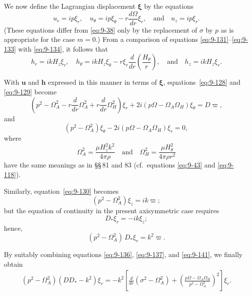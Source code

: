 We now define the Lagrangian displacement $\boldsymbol{\xi}$ by the equations
\begin{equation}
u_r = ip\xi_r, \quad u_\theta = ip\xi_\theta - r\frac{d\Omega}{dr}\xi_r, \quad \text{and} \quad u_z = ip\xi_r. \label{eq:9-134}
\end{equation}
(These equations differ from \eqref{eq:9-38} only by the replacement of $\sigma$ by $p$ as is appropriate for the case $m = 0$.) From a comparison of equations \eqref{eq:9-131}--\eqref{eq:9-133} with \eqref{eq:9-134}, it follows that
\begin{equation}
h_r = ikH_z\xi_r, \quad h_\theta = ikH_z\xi_\theta - r\xi_r\frac{d}{dr}\!\left(\frac{H_\theta}{r}\right), \quad \text{and} \quad h_z = ikH_z\xi_r. \label{eq:9-135}
\end{equation}

With $\mathbf{u}$ and $\mathbf{h}$ expressed in this manner in terms of $\boldsymbol{\xi}$, equations~\eqref{eq:9-128} and \eqref{eq:9-129} become
\begin{equation}
\left(p^2 - \Omega_A^2 - r\frac{d}{dr}\Omega_A^2 + r\frac{d}{dr}\Omega_H^2\right)\xi_r + 2i(p\Omega - \Omega_A\Omega_H)\xi_\theta = D\varpi, \label{eq:9-136}
\end{equation}
and
\begin{equation}
(p^2 - \Omega_A^2)\xi_\theta - 2i(p\Omega - \Omega_A\Omega_H)\xi_r = 0, \label{eq:9-137}
\end{equation}
where
\begin{equation}
\Omega_A^2 = \frac{\mu H_z^2 k^2}{4\pi\rho} \quad \text{and} \quad \Omega_H^2 = \frac{\mu H_\theta^2}{4\pi\rho r^2} \label{eq:9-138}
\end{equation}
have the same meanings as in \S\S\,81 and 83 (cf.\ equations \eqref{eq:9-43} and \eqref{eq:9-118}).

Similarly, equation~\eqref{eq:9-130} becomes
\begin{equation}
(p^2 - \Omega_A^2)\xi_z = ik\varpi; \label{eq:9-139}
\end{equation}
but the equation of continuity in the present axisymmetric case requires
\begin{equation}
D_*\xi_r = -ik\xi_z; \label{eq:9-140}
\end{equation}
hence,
\begin{equation}
(p^2 - \Omega_A^2)\, D_*\xi_r = k^2\varpi. \label{eq:9-141}
\end{equation}

By suitably combining equations \eqref{eq:9-136}, \eqref{eq:9-137}, and \eqref{eq:9-141}, we finally obtain
\begin{align}
(p^2 - \Omega_A^2)(DD_* - k^2)\xi_r = -k^2 \left[\frac{d}{dr}(\sigma^2 - \Omega_A^2) + \left(\frac{p\Omega - \Omega_A\Omega_H}{p^2 - \Omega_A^2}\right)^2\right]\xi_r. \label{eq:9-142}
\end{align}

